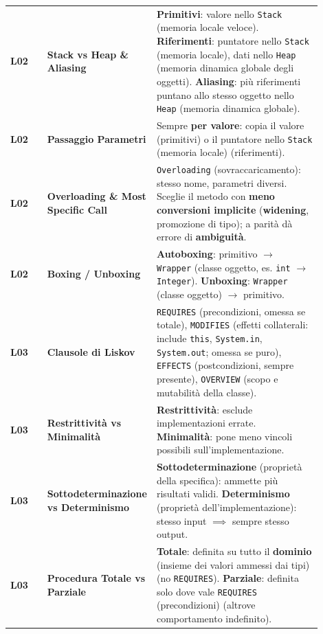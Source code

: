 \begin{longtable}{>{\raggedright\arraybackslash}p{0.12\linewidth}>{\raggedright\arraybackslash}p{0.24\linewidth}>{\raggedright\arraybackslash}p{0.54\linewidth}}
\textbf{L02} & \textbf{Stack vs Heap \& Aliasing} & \textbf{Primitivi}: valore nello \texttt{Stack} (memoria locale veloce). \textbf{Riferimenti}: puntatore nello \texttt{Stack} (memoria locale), dati nello \texttt{Heap} (memoria dinamica globale degli oggetti). \textbf{Aliasing}: più riferimenti puntano allo stesso oggetto nello \texttt{Heap} (memoria dinamica globale). \\

\textbf{L02} & \textbf{Passaggio Parametri} & Sempre \textbf{per valore}: copia il valore (primitivi) o il puntatore nello \texttt{Stack} (memoria locale) (riferimenti). \\

\textbf{L02} & \textbf{Overloading \& Most Specific Call} & \texttt{Overloading} (sovraccaricamento): stesso nome, parametri diversi. Sceglie il metodo con \textbf{meno conversioni implicite} (\textbf{widening}, promozione di tipo); a parità dà errore di \textbf{ambiguità}. \\

\textbf{L02} & \textbf{Boxing / Unboxing} & \textbf{Autoboxing}: primitivo $\to$ \texttt{Wrapper} (classe oggetto, es. \texttt{int} $\to$ \texttt{Integer}). \textbf{Unboxing}: \texttt{Wrapper} (classe oggetto) $\to$ primitivo. \\

\textbf{L03} & \textbf{Clausole di Liskov} & \texttt{REQUIRES} (precondizioni, omessa se totale), \texttt{MODIFIES} (effetti collaterali: include \texttt{this}, \texttt{System.in}, \texttt{System.out}; omessa se puro), \texttt{EFFECTS} (postcondizioni, sempre presente), \texttt{OVERVIEW} (scopo e mutabilità della classe). \\

\textbf{L03} & \textbf{Restrittività vs Minimalità} & \textbf{Restrittività}: esclude implementazioni errate. \textbf{Minimalità}: pone meno vincoli possibili sull'implementazione. \\

\textbf{L03} & \textbf{Sottodeterminazione vs Determinismo} & \textbf{Sottodeterminazione} (proprietà della specifica): ammette più risultati validi. \textbf{Determinismo} (proprietà dell'implementazione): stesso input $\implies$ sempre stesso output. \\

\textbf{L03} & \textbf{Procedura Totale vs Parziale} & \textbf{Totale}: definita su tutto il \textbf{dominio} (insieme dei valori ammessi dai tipi) (no \texttt{REQUIRES}). \textbf{Parziale}: definita solo dove vale \texttt{REQUIRES} (precondizioni) (altrove comportamento indefinito). \\


\end{longtable}
